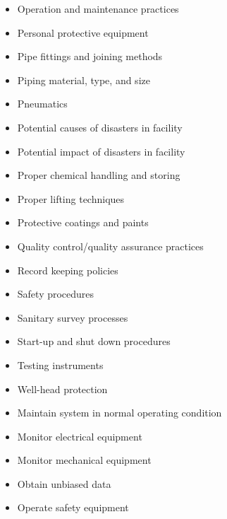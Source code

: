 \documentclass[10pt]{article}
\begin{document}
\begin{itemize}
  \item Operation and maintenance practices

  \item Personal protective equipment

  \item Pipe fittings and joining methods

  \item Piping material, type, and size

  \item Pneumatics

  \item Potential causes of disasters in facility

  \item Potential impact of disasters in facility

  \item Proper chemical handling and storing

  \item Proper lifting techniques

  \item Protective coatings and paints

  \item Quality control/quality assurance practices

  \item Record keeping policies

  \item Safety procedures

  \item Sanitary survey processes

  \item Start-up and shut down procedures

  \item Testing instruments

  \item Well-head protection

  \item Maintain system in normal operating condition

  \item Monitor electrical equipment

  \item Monitor mechanical equipment

  \item Obtain unbiased data

  \item Operate safety equipment


\end{itemize}
\end{document}
